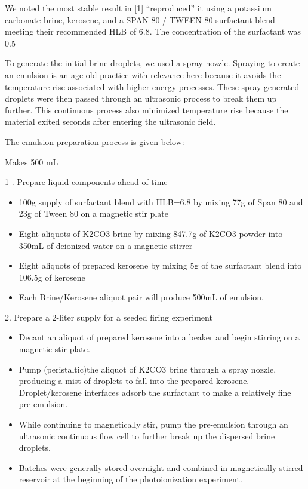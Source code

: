 We noted the most stable result in ​[1]​ “reproduced” it using a potassium carbonate brine, kerosene, and a SPAN 80 / TWEEN 80 surfactant blend meeting their recommended HLB of 6.8. The concentration of the surfactant was 0.5%

To generate the initial brine droplets, we used a spray nozzle. Spraying to create an emulsion is an age-old practice \cite{atkinsonKeroseneEmulsionHow1890} with relevance here because it avoids the temperature-rise associated with higher energy processes. These spray-generated droplets were then passed through an ultrasonic process to break them up further. This continuous process also minimized temperature rise because the material exited seconds after entering the ultrasonic field. 

The emulsion preparation process is given below:

Makes 500 mL 

1 . Prepare liquid components ahead of time 
\begin{itemize}
\item 100g supply of surfactant blend with HLB=6.8 by mixing 77g of Span 80 and 23g of Tween 80 on a magnetic stir plate 

\item Eight aliquots of K2CO3 brine by mixing 847.7g of K2CO3 powder into 350mL of deionized water on a magnetic stirrer 

\item Eight aliquots of prepared kerosene by mixing 5g of the surfactant blend into 106.5g of kerosene  

\item Each Brine/Kerosene aliquot pair will produce 500mL of emulsion. 
\end{itemize}


2. Prepare a 2-liter supply for a seeded firing experiment 

\begin{itemize}
    
\item Decant an aliquot of prepared kerosene into a beaker and begin stirring on a magnetic stir plate. 

\item Pump (peristaltic)the aliquot of K2CO3 brine through a spray nozzle, producing a mist of droplets to fall into the prepared kerosene. Droplet/kerosene interfaces adsorb the surfactant to make a relatively fine pre-emulsion. 

\item While continuing to magnetically stir, pump the pre-emulsion through an ultrasonic continuous flow cell to further break up the dispersed brine droplets. 

\item Batches were generally stored overnight and combined in magnetically stirred reservoir at the beginning of the photoionization experiment. 
\end{itemize}
